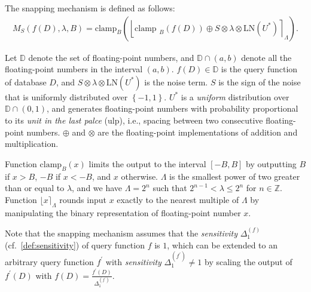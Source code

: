 
The snapping mechanism is defined as follows:
\begin{equation}
    \begin{split}
        M_{S}\left(f\left(D\right),\lambda,B\right) =\text{clamp}_{B}\left(\left\lfloor\text {clamp }_{B}\left(f\left(D\right) \right) \oplus S\otimes \lambda\otimes \text{LN}\left(U^{*}\right) \right\rceil_{\Lambda}\right).
    \end{split}
\end{equation}


Let $\mathbb{D}$ denote the set of floating-point numbers, and $\mathbb{D} \cap \left(a,b\right) $ denote all the floating-point numbers in the interval $\left(a,b\right)$.
$f\left(D\right) \in \mathbb{D} $ is the query function of database $D$, and $S\otimes \lambda\otimes \text{LN}\left(U^{*}\right)$ is the noise term.
$S$ is the sign of the noise that is uniformly distributed over $\left\{-1,1\right\} $. $U^{*}$ is a \textit{uniform} distribution over $\mathbb{D} \cap \left(0,1\right) $, and generates floating-point numbers with probability proportional to its \textit{unit in the last palce} (ulp), i.e., spacing between two consecutive floating-point numbers. 
$\oplus$ and $\otimes$ are the floating-point implementations of addition and multiplication.

Function $\text{clamp}_{B}\left(x\right) $ limits the output to the interval $\left[-B, B\right] $ by outputting $B$ if $x > B$, $-B$ if $x < -B$, and $x$ otherwise.   $\Lambda$ is the smallest power of two greater than or equal to $\lambda$, and we have $\Lambda=2^{n}$ such that $2^{n-1} < \lambda \leq2^{n}$ for $n \in \mathbb{Z} $. Function $\lfloor x\rceil_{\Lambda}$ rounds input $x$ exactly to the nearest multiple of $\Lambda$ by manipulating the binary representation of floating-point number $x$.

Note that the snapping mechanism assumes that the \textit{sensitivity} $\Delta_1 ^{\left(f\right) } $ (cf.~\autoref{def:sensitivity}) of query function $f$ is $1$, which can be extended to an arbitrary query function $f^{\prime}$ with \textit{sensitivity} $\Delta _1^{\left(f^{\prime}\right) }\neq 1$ by scaling the output of $f^{\prime}\left(D\right) $ with $f\left(D\right) =\frac{f^{\prime}\left(D\right) }{\Delta_1 ^{\left(f^{\prime}\right) }}$.


